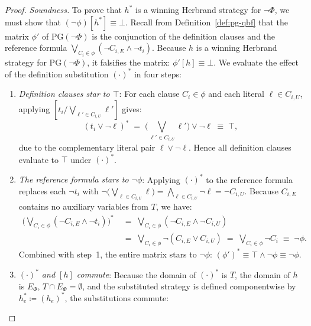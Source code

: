 \documentclass[runningheads]{llncs}
\newcommand{\PG}{\mathrm{PG}}
\begin{document}
\begin{proof}
    \emph{Soundness.}
    To prove that $h^*$ is a winning Herbrand strategy for $\neg\Phi$, we must show that $(\neg\phi)[h^*] \equiv \bot$.
    Recall from Definition~\ref{def:pg-qbf} that the matrix $\phi'$ of $\PG(\neg\Phi)$ is the conjunction of the definition clauses and the reference formula $\bigvee_{C_i \in \phi} (\neg C_{i,E} \land \neg t_i)$.
    Because $h$ is a winning Herbrand strategy for $\PG(\neg\Phi)$, it falsifies the matrix: $\phi'[h] \equiv \bot$.
    We evaluate the effect of the definition substitution $(\cdot)^*$ in four steps:
    \begin{enumerate}
        \item \emph{Definition clauses star to $\top$}:
              For each clause $C_i \in \phi$ and each literal $\ell \in C_{i,U}$, applying $[t_i / \bigvee_{\ell' \in C_{i,U}} \ell']$ gives:
              \begin{equation*}
                  (t_i \lor \neg\ell)^* \;=\; \Big(\bigvee_{\ell' \in C_{i,U}} \ell'\Big) \lor \neg\ell \;\equiv\; \top ,
              \end{equation*}
              due to the complementary literal pair $\ell \lor \neg\ell$.
              Hence all definition clauses evaluate to $\top$ under $(\cdot)^*$.
        \item \emph{The reference formula stars to $\neg\phi$}:
              Applying $(\cdot)^*$ to the reference formula replaces each $\neg t_i$ with $\neg\big(\bigvee_{\ell \in C_{i,U}} \ell\big) = \bigwedge_{\ell \in C_{i,U}} \neg\ell = \neg C_{i,U}$.
              Because $C_{i,E}$ contains no auxiliary variables from $T$, we have:
              \begin{align*}
                  \Big(\bigvee_{C_i \in \phi} (\neg C_{i,E} \land \neg t_i)\Big)^*
                   & \;=\; \bigvee_{C_i \in \phi} (\neg C_{i,E} \land \neg C_{i,U}) \\
                   & \;=\; \bigvee_{C_i \in \phi} \neg (C_{i,E} \lor C_{i,U})
                  \;=\; \bigvee_{C_i \in \phi} \neg C_i \;\equiv\; \neg\phi .
              \end{align*}
              Combined with step~1, the entire matrix stars to $\neg\phi$: $(\phi')^* \equiv \top \land \neg\phi \equiv \neg\phi$.
        \item \emph{$(\cdot)^*$ and $[h]$ commute}:
              Because the domain of $(\cdot)^*$ is $T$, the domain of $h$ is $E_\Phi$, $T \cap E_\Phi = \emptyset$, and the substituted strategy is defined componentwise by $h_e^* \coloneqq (h_e)^*$, the substitutions commute:

\end{enumerate}
\end{proof}
\end{document}
